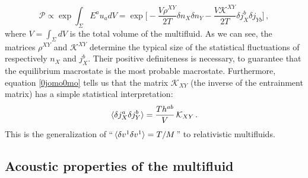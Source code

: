 \documentclass[a4paper, amsfonts, amssymb, amsmath, reprint, showkeys, nofootinbib, twoside, onecolumn,notitlepage]{revtex4-1}
\newcommand{\spc}{\quad \quad \quad}
\theoremstyle{definition}
\theoremstyle{theorem}
\begin{document}
\begin{equation}\label{0jomo0mo}
\mathcal{P} \propto \exp \int_\Sigma E^a u_a dV = \exp \bigg[ -\dfrac{V\rho^{XY}}{2T} \delta n_X \delta n_Y -\dfrac{V \mathcal{K}^{XY}}{2T} \delta j_X^b \delta j_{Yb}  \bigg] \, ,
\end{equation}
where $V=\int_\Sigma dV$ is the total volume of the multifluid. 
As we can see, the matrices $\mathcal{\rho}^{XY}$ and $\mathcal{K}^{XY}$ determine the typical size of the statistical fluctuations of respectively $ n_X$ and $ j_X^b$. Their positive definiteness is necessary, to guarantee that the equilibrium macrostate is the most probable macrostate. Furthermore, equation \eqref{0jomo0mo} tells us that the matrix $\mathcal{K}_{XY}$ (the inverse of the entrainment matrix) has a simple statistical interpretation:
\begin{equation}
\braket{\delta j_X^a \delta j_Y^b} = \dfrac{Th^{ab}}{V} \, \mathcal{K}_{XY}  \, .
\end{equation}
This is the generalization of ``$\, \braket{\delta v^1 \delta v^1}=T/M \,$''  \cite{landau5} to relativistic multifluids.


\subsection{Acoustic properties of the multifluid}\label{causalitypropriobene}
\end{document}
